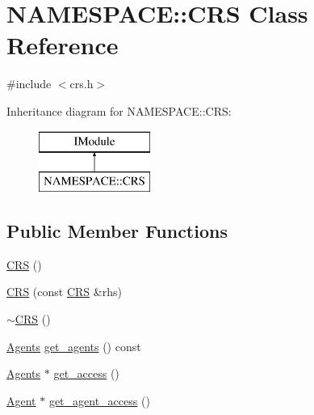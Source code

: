 \hypertarget{class_n_a_m_e_s_p_a_c_e_1_1_c_r_s}{}\section{N\+A\+M\+E\+S\+P\+A\+CE\+:\+:C\+RS Class Reference}
\label{class_n_a_m_e_s_p_a_c_e_1_1_c_r_s}


{\ttfamily \#include $<$crs.\+h$>$}

Inheritance diagram for N\+A\+M\+E\+S\+P\+A\+CE\+:\+:C\+RS\+:\begin{figure}[H]
\begin{center}
\leavevmode
\includegraphics[height=2.000000cm]{class_n_a_m_e_s_p_a_c_e_1_1_c_r_s}
\end{center}
\end{figure}
\subsection*{Public Member Functions}
\begin{DoxyCompactItemize}
\item 
\hyperlink{class_n_a_m_e_s_p_a_c_e_1_1_c_r_s_a6d71ddf40c42ae57cacd47e6965cfe49}{C\+RS} ()
\item 
\hyperlink{class_n_a_m_e_s_p_a_c_e_1_1_c_r_s_a95dfa391c6ca4422f50fdc7d4ff7f895}{C\+RS} (const \hyperlink{class_n_a_m_e_s_p_a_c_e_1_1_c_r_s}{C\+RS} \&rhs)
\item 
\hyperlink{class_n_a_m_e_s_p_a_c_e_1_1_c_r_s_a994d4f0fa2a102a0c75ef813c0979c61}{$\sim$\+C\+RS} ()
\item 
\hyperlink{namespace_n_a_m_e_s_p_a_c_e_a610552ba0110b3ee573bc9f3a7a8eac4}{Agents} \hyperlink{class_n_a_m_e_s_p_a_c_e_1_1_c_r_s_ae81748dc264ab0f110a747fa78d9f570}{get\+\_\+agents} () const
\item 
\hyperlink{namespace_n_a_m_e_s_p_a_c_e_a610552ba0110b3ee573bc9f3a7a8eac4}{Agents} $\ast$ \hyperlink{class_n_a_m_e_s_p_a_c_e_1_1_c_r_s_ae352638954df2684ae3e080e99bb3d1b}{get\+\_\+access} ()
\item 
\hyperlink{class_n_a_m_e_s_p_a_c_e_1_1_agent}{Agent} $\ast$ \hyperlink{class_n_a_m_e_s_p_a_c_e_1_1_c_r_s_a1835af2e509fb495de3e5eb515fbd5cd}{get\+\_\+agent\+\_\+access} ()
\end{DoxyCompactItemize}


